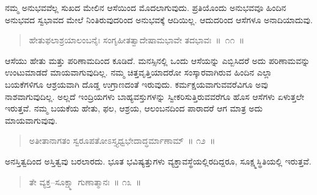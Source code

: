 
\vspace{0.1cm}

ನಮ್ಮ ಅನುಭವವೆಲ್ಲ ಸುಖದ ಮೇಲಿನ ಆಸೆಯಿಂದ ಮೊದಲಾಗುವುದು. ಪ್ರತಿಯೊಂದು ಅನುಭವವೂ ಹಿಂದಿನ ಅನುಭವದ ಸ್ವಭಾವದ ಮೇಲೆ ನಿಂತಿರುವುದರಿಂದ ಅನುಭವಕ್ಕೆ ಆದಿಯಿಲ್ಲ. ಆದುದರಿಂದ ಆಸೆಗಳೂ ಅನಾದಿಯಾದುವು. 

\vspace{-0.17cm}

\begin{verse}
ಹೇತುಫಲಾಶ್ರಯಾಲಂಬನೈಃ ಸಂಗೃಹೀತತ್ವಾದೇಷಾಮಭಾವೇ ತದಭಾವಃ~॥~೧೧~॥
\end{verse}

\vspace{-0.35cm}


\vspace{0.1cm}

ಆಸೆಯು ಹೇತು ಮತ್ತು ಪರಿಣಾಮದಿಂದ ಕೂಡಿದೆ. ಮನಸ್ಸಿನಲ್ಲಿ ಒಂದು ಆಸೆಯನ್ನು ಎಬ್ಬಿಸಿದರೆ ಅದು ಪರಿಣಾಮವನ್ನು ಉಂಟುಮಾಡದೆ ಮಾಯವಾಗುವುದಿಲ್ಲ. ನಮ್ಮ ಚಿತ್ತವೃತ್ತಿಯಾದರೋ ಸಂಸ್ಕಾರವಾಗಿರುವ ಹಿಂದಿನ ಎಲ್ಲಾ ಬಯಕೆಗಳಿಗೂ ಆಶ್ರಯವಾಗಿ ದೊಡ್ಡ ಉಗ್ರಾಣದಂತೆ ಇರುವುದು. ಕರ್ಮಕ್ಷಯವಾಗುವವರೆವಿಗೂ ಅವು ನಾಶವಾಗುವುದಿಲ್ಲ. ಅಲ್ಲದೆ ಇಂದ್ರಿಯಗಳು ಬಾಹ್ಯವಸ್ತುಗಳನ್ನು ಸ್ವೀಕರಿಸುತ್ತಿರುವವರೆಗೂ ಹೊಸ ಆಸೆಗಳು ಏಳುತ್ತಲೇ ಇರುತ್ತವೆ. ನಮ್ಮ ಬಯಕೆಯ ಹೇತು, ಫಲ, ಆಶ್ರಯ, ಆಲಂಬನದಿಂದ ಪಾರಾದರೆ ಆಗ ಮಾತ್ರ ಅದು ಮಾಯವಾಗುವುವು. 

\vspace{-0.2cm}

\begin{verse}
ಅತೀತಾನಾಗತಂ ಸ್ವರೂಪತೋಽಸ್ತ್ಯಧ್ವಭೇದಾದ್ಧರ್ಮಾಣಾಮ್​~॥ ೧೨~॥
\end{verse}

\vspace{-0.35cm}


\vspace{0.1cm}

ಅನಸ್ತಿತ್ವದಿಂದ ಅಸ್ತಿತ್ವವು ಬರಲಾರದು. ಭೂತ ಭವಿಷ್ಯತ್ತುಗಳು ವ್ಯಕ್ತಾವಸ್ಥೆಯಲ್ಲಿರ\-ದಿದ್ದರೂ, ಸೂಕ್ಷ್ಮಸ್ಥಿತಿಯಲ್ಲಿ ಇರುತ್ತವೆ. 

\vspace{-0.15cm}

\begin{verse}
ತೇ ವ್ಯಕ್ತ–ಸೂಕ್ಷ್ಮಾ ಗುಣಾತ್ಮಾನಃ~॥ ೧೩~॥
\end{verse}

\vspace{-0.3cm}

